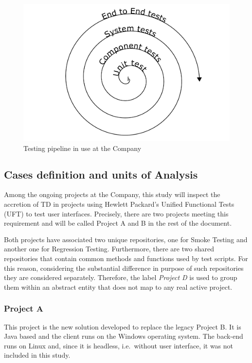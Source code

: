 
\begin{figure}[hbt]
    \centering
    \includegraphics[width=\textwidth]{figure/testing_pipeline.pdf}
    \caption{Testing pipeline in use at the Company}
    \label{fig:testing_pipeline}
\end{figure}

\subsection{Cases definition and units of Analysis} \label{sec:cases_definition}

Among the ongoing projects at the Company, this study will inspect the accretion of TD in projects using Hewlett Packard's Unified Functional Tests (UFT) to test user interfaces. Precisely, there are two projects meeting this requirement and will be called Project A and B in the rest of the document.

Both projects have associated two unique repositories, one for Smoke Testing and another one for Regression Testing. Furthermore, there are two shared repositories that contain common methods and functions used by test scripts. For this reason, considering the substantial difference in purpose of such repositories they are considered separately. Therefore, the label \textit{Project D} is used to group them within an abstract entity that does not map to any real active project.


\subsubsection{Project A}
This project is the new solution developed to replace the legacy Project B. It is Java based and the client runs on the Windows operating system. The back-end runs on Linux and, since it is headless, i.e.\ without user interface, it was not included in this study.

